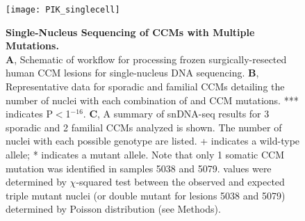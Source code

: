 \begin{figure}[tbp!]
\begin{center}
\texttt{[image: PIK\_singlecell]}
\end{center}
\caption[Single-Nucleus Sequencing of CCMs with Three Pathogenic Mutations] {\textbf{Single-Nucleus Sequencing of CCMs with Multiple Mutations.} \\ \textbf{A}, Schematic of workflow for processing frozen surgically-resected human CCM lesions for single-nucleus DNA sequencing. \textbf{B}, Representative data for sporadic and familial CCMs detailing the number of nuclei with each combination of  and CCM mutations. *** indicates P$<$1$^{-16}$. \textbf{C}, A summary of snDNA-seq results for 3 sporadic and 2 familial CCMs analyzed is shown. The number of nuclei with each possible genotype are listed. + indicates a wild-type allele; * indicates a mutant allele. Note that only 1 somatic CCM mutation was identified in samples 5038 and 5079.  values were determined by $\chi$-squared test between the observed and expected triple mutant nuclei (or double mutant for lesions 5038 and 5079) determined by Poisson distribution (see Methods).}

\label{PIK_singlecell}
\end{figure}
